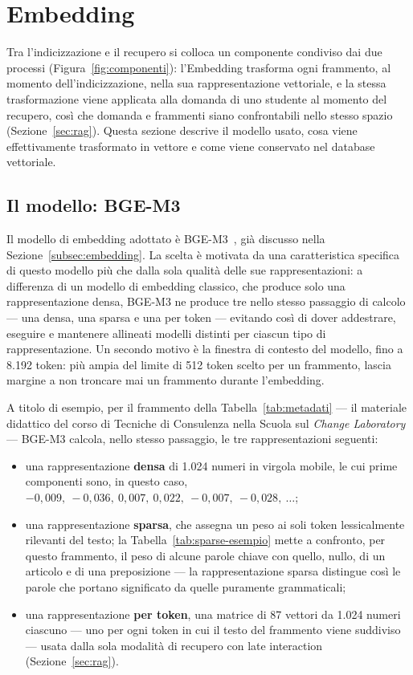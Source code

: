 \section{Embedding}\label{sec:embedding}

Tra l'indicizzazione e il recupero si colloca un componente condiviso dai due processi (Figura~\ref{fig:componenti}):
l'Embedding trasforma ogni frammento, al momento dell'indicizzazione, nella sua rappresentazione vettoriale, e la
stessa trasformazione viene applicata alla domanda di uno studente al momento del recupero, così che domanda e
frammenti siano confrontabili nello stesso spazio (Sezione~\ref{sec:rag}). Questa sezione descrive il modello usato,
cosa viene effettivamente trasformato in vettore e come viene conservato nel database vettoriale.

\subsection{Il modello: BGE-M3}

Il modello di embedding adottato è BGE-M3~\cite{chen2024bgem3}, già discusso nella Sezione~\ref{subsec:embedding}. La
scelta è motivata da una caratteristica specifica di questo modello più che dalla sola qualità delle sue
rappresentazioni: a differenza di un modello di embedding classico, che produce solo una rappresentazione densa, BGE-M3
ne produce tre nello stesso passaggio di calcolo --- una densa, una sparsa e una per token --- evitando così di dover addestrare, eseguire e
mantenere allineati modelli distinti per ciascun tipo di rappresentazione. Un secondo motivo è la finestra di
contesto del modello, fino a 8.192 token: più ampia del limite di 512 token scelto per un frammento, lascia margine a non troncare mai un frammento durante l'embedding.

A titolo di esempio, per il frammento della Tabella~\ref{tab:metadati} --- il materiale didattico del corso di
Tecniche di Consulenza nella Scuola sul \emph{Change Laboratory} --- BGE-M3 calcola, nello stesso passaggio, le tre
rappresentazioni seguenti:
\begin{itemize}
  \item una rappresentazione \textbf{densa} di 1.024 numeri in virgola mobile, le cui prime componenti sono, in
    questo caso, $-0{,}009,\ -0{,}036,\ 0{,}007,\ 0{,}022,\ -0{,}007,\ -0{,}028,\ \dots$;
  \item una rappresentazione \textbf{sparsa}, che assegna un peso ai soli token lessicalmente rilevanti del testo;
    la Tabella~\ref{tab:sparse-esempio} mette a confronto, per questo frammento, il peso di alcune parole chiave
    con quello, nullo, di un articolo e di una preposizione --- la rappresentazione sparsa distingue così le parole
    che portano significato da quelle puramente grammaticali;
  \item una rappresentazione \textbf{per token}, una matrice di 87 vettori da 1.024 numeri ciascuno --- uno per
    ogni token in cui il testo del frammento viene suddiviso --- usata dalla sola modalità di recupero con late
    interaction (Sezione~\ref{sec:rag}).
\end{itemize}


